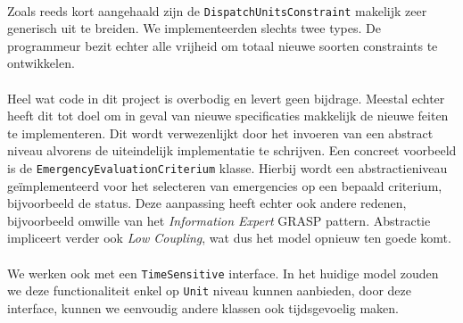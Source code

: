 \paragraph{}
Zoals reeds kort aangehaald zijn de \texttt{DispatchUnitsConstraint} makelijk zeer generisch uit te breiden. We implementeerden slechts twee types. De programmeur bezit echter alle vrijheid om totaal nieuwe soorten constraints te ontwikkelen.
\paragraph{}
Heel wat code in dit project is overbodig en levert geen bijdrage. Meestal echter heeft dit tot doel om in geval van nieuwe specificaties makkelijk de nieuwe feiten te implementeren. Dit wordt verwezenlijkt door het invoeren van een abstract niveau alvorens de uiteindelijk implementatie te schrijven. Een concreet voorbeeld is de \texttt{Emergency\-Evaluation\-Criterium} klasse. Hierbij wordt een abstractieniveau ge\"implementeerd voor het selecteren van emergencies op een bepaald criterium, bijvoorbeeld de status. Deze aanpassing heeft echter ook andere redenen, bijvoorbeeld omwille van het \textit{Information Expert} GRASP pattern. Abstractie impliceert verder ook \textit{Low Coupling}, wat dus het model opnieuw ten goede komt.
\paragraph{}
We werken ook met een \texttt{TimeSensitive} interface. In het huidige model zouden we deze functionaliteit enkel op \texttt{Unit} niveau kunnen aanbieden, door deze interface, kunnen we eenvoudig andere klassen ook tijdsgevoelig maken.